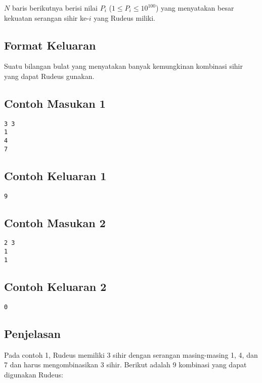 \documentclass{article}
\begin{document}
$N$ baris berikutnya berisi nilai $P_i$ ($1 \leq P_i \leq 10^{100}$) yang menyatakan besar kekuatan serangan sihir ke-$i$ yang Rudeus miliki.


\subsection*{Format Keluaran}

Suatu bilangan bulat yang menyatakan banyak kemungkinan kombinasi sihir yang dapat Rudeus gunakan.

\begin{multicols}{2}
\subsection*{Contoh Masukan 1}
\begin{lstlisting}
3 3
1
4
7
\end{lstlisting}
\columnbreak
\subsection*{Contoh Keluaran 1}
\begin{lstlisting}
9
\end{lstlisting}
\vfill
\null
\end{multicols}

\begin{multicols}{2}
\subsection*{Contoh Masukan 2}
\begin{lstlisting}
2 3
1
1
\end{lstlisting}
\columnbreak
\subsection*{Contoh Keluaran 2}
\begin{lstlisting}
0
\end{lstlisting}
\vfill
\null
\end{multicols}


\subsection*{Penjelasan}

Pada contoh 1, Rudeus memiliki 3 sihir dengan serangan masing-masing 1, 4, dan 7 dan harus mengombinasikan 3 sihir. Berikut adalah 9 kombinasi yang dapat digunakan Rudeus:
\end{document}
